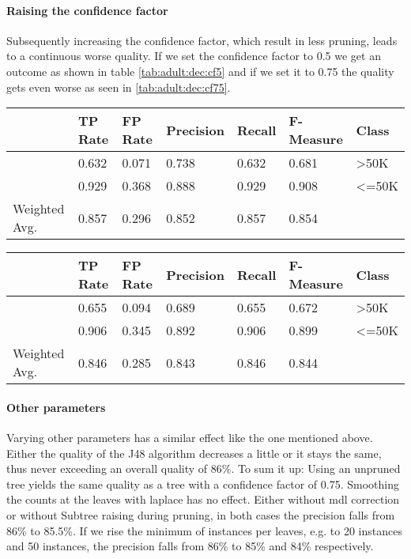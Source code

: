\documentclass[paper=a4, fontsize=11pt]{scrartcl} %
\numberwithin{equation}{section} %
\numberwithin{figure}{section} %
\numberwithin{table}{section} %
\begin{document}
\paragraph{Raising the confidence factor}
Subsequently increasing the confidence factor, which result in less pruning, leads to a continuous worse quality. If we set the confidence factor to 0.5 we get an outcome as shown in table \ref{tab:adult:dec:cf5} and if we set it to 0.75 the quality gets even worse as seen in \ref{tab:adult:dec:cf75}.
\begin{table*}[htb]\centering
    \begin{tabular*}{\columnwidth}{@{}lllllll@{}}
        \toprule 
              &  TP Rate & FP Rate & Precision & Recall & F-Measure & Class    \\  \midrule
              &  0.632   & 0.071   & 0.738     & 0.632  & 0.681     & >50K     \\ 
              &  0.929   & 0.368   & 0.888     & 0.929  & 0.908     & <=50K    \\ 
Weighted Avg. &  0.857   & 0.296   & 0.852     & 0.857  & 0.854     &          \\  \bottomrule
    \end{tabular*}
\caption{Decision Tree -- Confidence Factor of 0.5} 
\label{tab:adult:dec:cf5}
\end{table*}
\FloatBarrier


\begin{table*}[htb]\centering
    \begin{tabular*}{\columnwidth}{@{}lllllll@{}}
        \toprule 
              &  TP Rate & FP Rate & Precision & Recall &  F-Measure &  Class  \\ \midrule        
              &  0.655   & 0.094   & 0.689     & 0.655  &  0.672     &  >50K   \\          
              &  0.906   & 0.345   & 0.892     & 0.906  &  0.899     &  <=50K  \\          
Weighted Avg. &  0.846   & 0.285   & 0.843     & 0.846  &  0.844     &         \\ \bottomrule          
    \end{tabular*}
\caption{Decision Tree -- Confidence Factor of 0.75} 
\label{tab:adult:dec:cf75}
\end{table*}
\FloatBarrier

\paragraph{Other parameters}
Varying other parameters has a similar effect like the one mentioned above. Either the quality of the J48 algorithm decreases a little or it stays the same, thus never exceeding an overall quality of 86\%. To sum it up: Using an unpruned tree yields the same quality as a tree with a confidence factor of 0.75. Smoothing the counts at the leaves with laplace has no effect. Either without mdl correction or without Subtree raising during pruning, in both cases the precision falls from 86\% to 85.5\%. If we rise the minimum of instances per leaves, e.g. to 20 instances and 50 instances, the precision falls from 86\% to 85\% and 84\% respectively.
\end{document}
